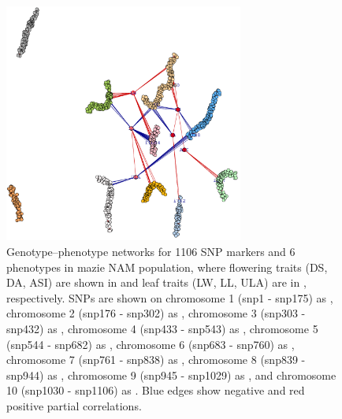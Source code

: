 \begin{figure}[!t]
	\centering
	\includegraphics[width=0.7\textwidth]{Fig7.pdf}
	\caption{Genotype--phenotype networks for 1106 SNP markers and 6 phenotypes in mazie NAM population, where flowering traits (DS, DA, ASI) are shown in \tikzcircle[black, fill=red]{2.5pt} and leaf traits (LW, LL, ULA) are in \tikzcircle[black, fill=chestnut]{2.5pt}, respectively. SNPs are shown on chromosome 1 (snp1 - snp175) as \tikzcircle[black, fill=apricot]{2.5pt}, chromosome 2 (snp176 - snp302) as \tikzcircle[black, fill=iceberg]{2.5pt}, chromosome 3 (snp303 - snp432) as \tikzcircle[black, fill=applegreen]{2.5pt}, chromosome 4 (snp433 - snp543) as \tikzcircle[black, fill=gray]{2.5pt}, chromosome 5 (snp544 - snp682) as \tikzcircle[black, fill=white]{2.5pt}, chromosome 6 (snp683 - snp760) as \tikzcircle[black, fill=bronze]{2.5pt}, chromosome 7 (snp761 - snp838) as \tikzcircle[black, fill=beaublue]{2.5pt}, chromosome 8 (snp839 - snp944) as \tikzcircle[black, fill=celadon]{2.5pt}, chromosome 9 (snp945 - snp1029) as \tikzcircle[black, fill=amber]{2.5pt}, and chromosome 10 (snp1030 - snp1106) as \tikzcircle[black, fill=bubblegum]{2.5pt}. Blue edges show negative and red positive partial correlations. %
	} %
	\label{maize}
\end{figure}


